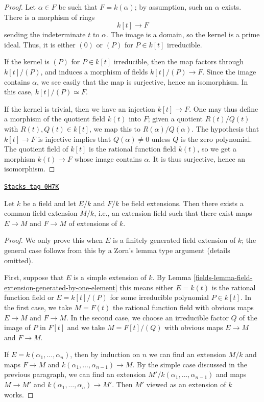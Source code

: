 \begin{proof}
Let $\alpha \in F$ be such that $F = k(\alpha)$; by assumption, such an
$\alpha$ exists. There is a morphism of rings
$$
k[t] \to F
$$
sending the indeterminate $t$ to $\alpha$. The image is a domain, so the
kernel is a prime ideal. Thus, it is either $(0)$ or $(P)$ for $P \in k[t]$
irreducible.

\medskip\noindent
If the kernel is $(P)$ for $P \in k[t]$ irreducible, then the map factors
through $k[t]/(P)$, and induces a morphism of fields $k[t]/(P) \to F$. Since
the image contains $\alpha$, we see easily that the map is surjective, hence
an isomorphism. In this case, $k[t]/(P) \simeq F$.

\medskip\noindent
If the kernel is trivial, then we have an injection $k[t] \to F$.
One may thus define a morphism of the quotient field $k(t)$ into $F$; given a
quotient $R(t)/Q(t)$ with $R(t), Q(t) \in k[t]$, we map this to
$R(\alpha)/Q(\alpha)$. The hypothesis that $k[t] \to F$ is injective implies
that $Q(\alpha) \neq 0$ unless $Q$ is the zero polynomial.
The quotient field of $k[t]$ is the rational function field $k(t)$, so we get
a morphism $k(t) \to F$
whose image contains $\alpha$. It is thus surjective, hence an isomorphism.
\end{proof}

\begin{lemma}
\label{fields-lemma-common-extension-field}
\href{https://stacks.math.columbia.edu/tag/0H7K}{\texttt{Stacks tag 0H7K}}

Let $k$ be a field and let $E/k$ and $F/k$ be field extensions.
Then there exists a common field extension $M/k$, i.e., an extension
field such that there exist maps $E \to M$ and $F \to M$ of extensions of $k$.
\end{lemma}

\begin{proof}

We only prove this when $E$ is a finitely generated field extension
of $k$; the general case follows from this by a Zorn's lemma type argument
(details omitted).

\medskip\noindent
First, suppose that $E$ is a simple extension of $k$. By
Lemma \ref{fields-lemma-field-extension-generated-by-one-element}
this means either $E = k(t)$ is the rational function field
or $E = k[t]/(P)$ for some irreducible polynomial $P \in k[t]$.
In the first case, we take $M = F(t)$ the rational function field
with obvious maps $E \to M$ and $F \to M$. In the second case, we
choose an irreducible factor $Q$ of the image of $P$ in $F[t]$
and we take $M = F[t]/(Q)$ with obvious maps $E \to M$ and $F \to M$.

\medskip\noindent
If $E = k(\alpha_1, \ldots, \alpha_n)$, then by induction on $n$
we can find an extension $M/k$ and maps $F \to M$ and
$k(\alpha_1, \ldots, \alpha_{n - 1}) \to M$. By the simple
case discussed in the previous paragraph,
we can find an extension $M'/k(\alpha_1, \ldots, \alpha_{n - 1})$
and maps $M \to M'$ and $k(\alpha_1, \ldots, \alpha_n) \to M'$.
Then $M'$ viewed as an extension of $k$ works.
\end{proof}

